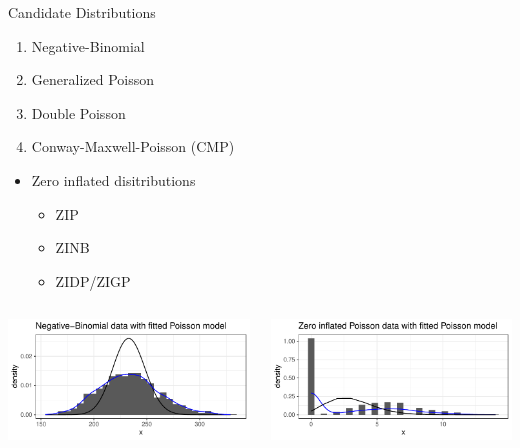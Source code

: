 \documentclass[
  ignorenonframetext,
]{beamer}
\providecommand{\tightlist}{%
  \setlength{\itemsep}{0pt}\setlength{\parskip}{0pt}}\usepackage{longtable,booktabs,array}
\begin{document}
\begin{frame}{Candidate Distributions}
\protect\hypertarget{candidate-distributions}{}
\begin{enumerate}
\tightlist
\item
  Negative-Binomial
\item
  Generalized Poisson
\item
  Double Poisson
\item
  Conway-Maxwell-Poisson (CMP)
\end{enumerate}

\begin{itemize}
\tightlist
\item
  Zero inflated disitributions

  \begin{itemize}
  \tightlist
  \item
    ZIP
  \item
    ZINB
  \item
    ZIDP/ZIGP
  \end{itemize}
\end{itemize}

\begin{columns}[T]
\begin{column}{0.5\textwidth}
\includegraphics{cmp_pres_files/figure-beamer/unnamed-chunk-2-1.pdf}
\end{column}

\begin{column}{0.5\textwidth}
\includegraphics{cmp_pres_files/figure-beamer/unnamed-chunk-3-1.pdf}
\end{column}
\end{columns}
\end{frame}
\end{document}
